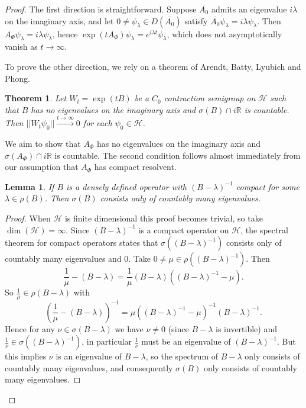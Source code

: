 \documentclass{article}
\numberwithin{equation}{section}
\newtheorem*{theorem*}{Theorem}
\newtheorem{lemma}{Lemma}[section]
\begin{document}
\begin{proof}
The first direction is straightforward. Suppose $\overline{A_0}$ admits an eigenvalue $i\lambda$ on the imaginary axis, and let $0\neq\psi_\lambda\in D(\overline{A_0})$ satisfy $\overline{A_0}\psi_{\lambda}=i\lambda \psi_{\lambda}$. Then $A_\Phi \psi_\lambda=i\lambda \psi_{\lambda}$, hence $\exp(tA_\Phi)\psi_\lambda=e^{i\lambda t}\psi_\lambda$, which does not asymptotically vanish as $t \to \infty$.

To prove the other direction, we rely on a theorem of Arendt, Batty, Lyubich and Phong.
\begin{theorem*}
    \cite{ArendtStab,Lyubich1988} Let $W_t=\exp(tB)$ be a $C_0$ contraction semigroup on $\mathcal{H}$ such that $B$ has no eigenvalues on the imaginary axis and $\sigma(B)\cap i\mathbb{R}$ is countable. Then $||W_t \psi_0||\xrightarrow{t \to \infty}0$ for each $\psi_0 \in \mathcal{H}$. 
\end{theorem*}
We aim to show that $A_\Phi$ has no eigenvalues on the imaginary axis and $\sigma(A_\Phi)\cap i \mathbb{R}$ is countable. The second condition follows almost immediately from our assumption that $A_\Phi$ has compact resolvent.
\begin{lemma}
    If $B$ is a densely defined operator with $(B-\lambda)^{-1}$ compact for some $\lambda \in \rho(B)$. Then $\sigma(B)$ consists only of countably many eigenvalues.
\end{lemma}
\begin{proof}
When $\mathcal{H}$ is finite dimensional this proof becomes trivial, so take $\dim(\mathcal{H})=\infty$. Since $(B-\lambda)^{-1}$ is a compact operator on $\mathcal{H}$, the spectral theorem for compact operators \cite[Theorem 6.8]{Brezis} states that $\sigma((B-\lambda)^{-1})$ consists only of countably many eigenvalues and $0$. Take $0 \neq\mu\in \rho((B-\lambda)^{-1})$. Then
\begin{equation}
    \frac{1}{\mu}-(B-\lambda)=\frac{1}{\mu} (B-\lambda)\left((B-\lambda)^{-1}-\mu \right).
\end{equation}
So $\frac{1}{\mu}\in \rho(B-\lambda)$ with 
\begin{equation}
    \left(\frac{1}{\mu}-(B-\lambda)\right)^{-1}=\mu\left((B-\lambda)^{-1}-\mu \right)^{-1}(B-\lambda)^{-1}.
\end{equation}
Hence for any $\nu \in \sigma(B-\lambda)$ we have $\nu \neq 0$ (since $B-\lambda$ is invertible) and $\frac{1}{\nu}\in \sigma((B-\lambda)^{-1})$, in particular $\frac{1}{\nu}$ must be an eigenvalue of $(B-\lambda)^{-1}$. But this implies $\nu$ is an eigenvalue of $B-\lambda$, so the spectrum of $B-\lambda$ only consists of countably many eigenvalues, and consequently $\sigma(B)$ only consists of countably many eigenvalues.

\end{proof}
\end{proof}
\end{document}

